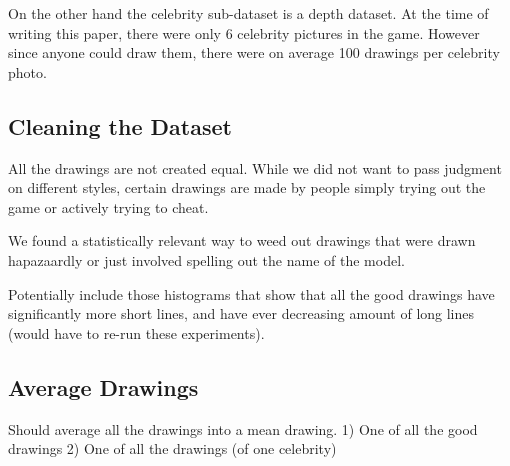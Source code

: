 On the other hand the celebrity sub-dataset is a depth dataset. At the time of writing this paper, there were only 6 celebrity pictures in the game. However since anyone could draw them, there were on average 100 drawings per celebrity photo.

\subsection{Cleaning the Dataset}
All the drawings are not created equal. While we did not want to pass judgment on different styles, certain drawings are made by people simply trying out the game or actively trying to cheat.

We found a statistically relevant way to weed out drawings that were drawn hapazaardly or just involved spelling out the name of the model.

Potentially include those histograms that show that all the good drawings have significantly more short lines, and have ever decreasing amount of long lines (would have to re-run these experiments).

\subsection{Average Drawings}
Should average all the drawings into a mean drawing.
1) One of all the good drawings
2) One of all the drawings (of one celebrity)